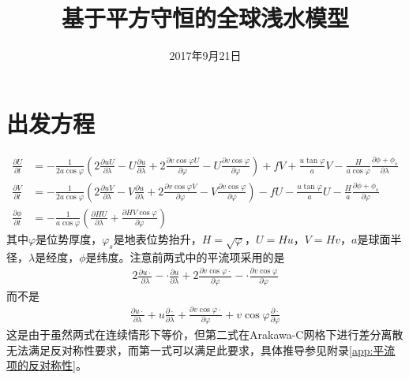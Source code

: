 \documentclass{ctexart}
\title{基于平方守恒的全球浅水模型}
\date{2017年9月21日}
\begin{document}
\maketitle

\section{出发方程}

\begin{align}
	\frac{\partial U}{\partial t} & = - \frac{1}{2 a \cos{\varphi}} \left( 2 \frac{\partial u U}{\partial \lambda} - U \frac{\partial u}{\partial \lambda} + 2 \frac{\partial v \cos{\varphi} U}{\partial \varphi} - U \frac{\partial v \cos{\varphi}}{\partial \varphi} \right) + f V + \frac{u \tan{\varphi}}{a} V - \frac{H}{a \cos{\varphi}} \frac{\partial \phi + \phi_s}{\partial \lambda} \\
  \frac{\partial V}{\partial t} & = - \frac{1}{2 a \cos{\varphi}} \left( 2 \frac{\partial u V}{\partial \lambda} - V \frac{\partial u}{\partial \lambda} + 2 \frac{\partial v \cos{\varphi} V}{\partial \varphi} - V \frac{\partial v \cos{\varphi}}{\partial \varphi} \right) - f U - \frac{u \tan{\varphi}}{a} U - \frac{H}{a} \frac{\partial \phi + \phi_s}{\partial \varphi} \\
  \frac{\partial \phi}{\partial t} & = - \frac{1}{a \cos{\varphi}} \left( \frac{\partial H U}{\partial \lambda} + \frac{\partial H V \cos{\varphi}}{\partial \varphi} \right)
\end{align}
其中$\varphi$是位势厚度，$\varphi_s$是地表位势抬升，$H = \sqrt{\varphi}$，$U = H u$，$V = H v$，$a$是球面半径，$\lambda$是经度，$\phi$是纬度。注意前两式中的平流项采用的是
\begin{align}
  2 \frac{\partial u \cdot}{\partial \lambda} - \cdot \frac{\partial u}{\partial \lambda} + 2 \frac{\partial v \cos{\varphi} \cdot}{\partial \varphi} - \cdot \frac{\partial v \cos{\varphi}}{\partial \varphi}
\end{align}
而不是
\begin{align}
  \frac{\partial u \cdot}{\partial \lambda} + u \frac{\partial \cdot}{\partial \lambda} + \frac{\partial v \cos{\varphi} \cdot}{\partial \varphi} + v \cos{\varphi} \frac{\partial \cdot}{\partial \varphi}
\end{align}
这是由于虽然两式在连续情形下等价，但第二式在Arakawa-C网格下进行差分离散无法满足反对称性要求，而第一式可以满足此要求，具体推导参见附录\ref{app:平流项的反对称性}。
\end{document}
